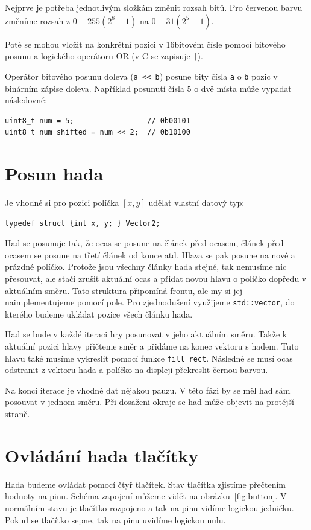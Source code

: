 \documentclass[12pt]{article}
\begin{document}
Nejprve je potřeba jednotlivým složkám změnit rozsah bitů.
Pro červenou barvu změníme rozsah z $0 - 255 (2^8-1)$ na $0 - 31 (2^{5}-1)$.

Poté se mohou vložit na konkrétní pozici v 16bitovém čísle pomocí bitového posunu a logického operátoru OR (v C se zapisuje \texttt{|}).

Operátor bitového posunu doleva (\texttt{a << b}) posune bity čísla \texttt{a} o \texttt{b} pozic v binárním zápise doleva.
Například posunutí čísla $5$ o dvě místa může vypadat následovně:
\begin{verbatim}
uint8_t num = 5;                 // 0b00101
uint8_t num_shifted = num << 2;  // 0b10100
\end{verbatim}


\section{Posun hada}
Je vhodné si pro pozici políčka $[x, y]$ udělat vlastní datový typ:
\begin{verbatim}
typedef struct {int x, y; } Vector2;
\end{verbatim}

Had se posunuje tak, že ocas se posune na článek před ocasem, článek před ocasem se posune na třetí článek od konce atd.
Hlava se pak posune na nové a prázdné políčko.
Protože jsou všechny články hada stejné, tak nemusíme nic přesouvat, ale stačí zrušit aktuální ocas a přidat novou hlavu o poličko dopředu v aktuálním směru.
Tato struktura připomíná frontu, ale my si jej naimplementujeme pomocí pole.
Pro zjednodušení využijeme \texttt{std::vector}, do kterého budeme ukládat pozice všech článku hada.

Had se bude v každé iteraci hry posunovat v jeho aktuálním směru.
Takže k aktuální pozici hlavy přičteme směr a přidáme na konec vektoru s hadem.
Tuto hlavu také musíme vykreslit pomocí funkce \texttt{fill_rect}.
Následně se musí ocas odstranit z vektoru hada a políčko na displeji překreslit černou barvou.

Na konci iterace je vhodné dat nějakou pauzu.
V této fázi by se měl had sám posouvat v jednom směru.
Při dosaženi okraje se had může objevit na protější straně.

\section{Ovládání hada tlačítky}
Hada budeme ovládat pomocí čtyř tlačítek.
Stav tlačítka zjistíme přečtením hodnoty na pinu.
Schéma zapojení můžeme vidět na obrázku~\ref{fig:button}.
V normálním stavu je tlačítko rozpojeno a tak na pinu vidíme logickou jedničku.
Pokud se tlačítko sepne, tak na pinu uvidíme logickou nulu.
\end{document}
